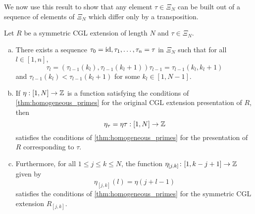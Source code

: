 We now use this result to show that any element $\tau \in \Xi_N$ can be built out of a
sequence of elements of $\Xi_N$ which differ only by a transposition.
\begin{proposition}\label{prop:eta_invariance}
	Let $R$ be a symmetric CGL extension of length $N$ and $\tau \in \Xi_N$.
	\begin{enumerate}[(a)]
		\item There exists a sequence $\tau_0 = \operatorname{id}, \tau_1, \dots, \tau_n = \tau$ in $\Xi_N$ such
		      that for all $l \in [1, n]$,
		      \begin{equation*}
			      \tau_l = (\tau_{l-1}(k_l), \tau_{l-1}(k_l + 1))\tau_{l-1} = \tau_{l-1}(k_l, k_l + 1)
		      \end{equation*}
		      and $\tau_{l-1}(k_l) < \tau_{l-1}(k_l + 1)$ for some $k_l \in [1, N-1]$.
		\item If $\eta : [1, N] \to \mathbb{Z}$ is a function satisfying the conditions of
		      \cref{thm:homogeneous_primes} for the original CGL extension presentation of $R$, then
		      \begin{equation*}
			      \eta_\tau = \eta \tau : [1, N] \to \mathbb{Z}
		      \end{equation*}
		      satisfies the conditions of \cref{thm:homogeneous_primes} for the presentation of $R$
		      corresponding to $\tau$.

		\item Furthermore, for all $1 \leq j \leq k \leq N$, the function $\eta_{[j, k]} \colon [1,
				      k-j+1] \to \mathbb{Z}$ given by
		      \begin{equation*}
			      \eta_{[j,k]}(l) = \eta(j+l-1)
		      \end{equation*}
		      satisfies the conditions of \cref{thm:homogeneous_primes} for the symmetric CGL
		      extension $R_{[j,k]}$.
	\end{enumerate}
\end{proposition}
